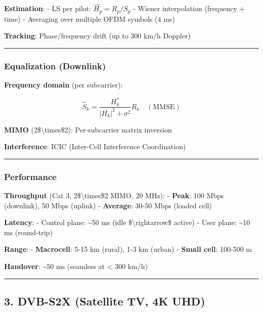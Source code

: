 \textbf{Estimation}: - LS per pilot: \(\hat{H}_p = R_p / S_p\) - Wiener
interpolation (frequency + time) - Averaging over multiple OFDM symbols
(4 ms)

\textbf{Tracking}: Phase/frequency drift (up to 300 km/h Doppler)

\begin{center}\rule{0.5\linewidth}{0.5pt}\end{center}

\subsubsection{Equalization (Downlink)}\label{equalization-downlink}

\textbf{Frequency domain} (per subcarrier):

\[
\hat{S}_k = \frac{H_k^*}{|H_k|^2 + \sigma^2} R_k \quad (\text{MMSE})
\]

\textbf{MIMO} (2\$\textbackslash times\$2): Per-subcarrier matrix
inversion

\textbf{Interference}: ICIC (Inter-Cell Interference Coordination)

\begin{center}\rule{0.5\linewidth}{0.5pt}\end{center}

\subsubsection{Performance}\label{performance-1}

\textbf{Throughput} (Cat 3, 2\$\textbackslash times\$2 MIMO, 20 MHz): -
\textbf{Peak}: 100 Mbps (downlink), 50 Mbps (uplink) - \textbf{Average}:
30-50 Mbps (loaded cell)

\textbf{Latency}: - Control plane: \textasciitilde50 ms (idle
\$\textbackslash rightarrow\$ active) - User plane: \textasciitilde10 ms
(round-trip)

\textbf{Range}: - \textbf{Macrocell}: 5-15 km (rural), 1-3 km (urban) -
\textbf{Small cell}: 100-500 m

\textbf{Handover}: \textasciitilde50 ms (seamless at \textless{} 300
km/h)

\begin{center}\rule{0.5\linewidth}{0.5pt}\end{center}

\subsection{3. DVB-S2X (Satellite TV, 4K
UHD)}\label{dvb-s2x-satellite-tv-4k-uhd}

